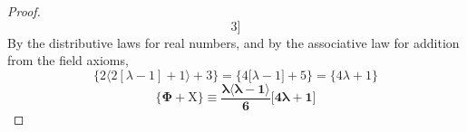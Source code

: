 \documentclass[preview]{standalone}
\begin{document}
\begin{proof}
\begin{equation*}
            3
        \Bigg]
    \end{equation*}
    By the distributive laws for real numbers, 
    and by the associative law for addition from the field axioms,
    \begin{equation*}
        \bigg \{
            2 \Big \langle 2 [ \lambda - 1 ] + 1 \Big \rangle + 3
        \bigg \}
            =
        \bigg \{
            4 [ \lambda - 1 \big ] + 5
        \bigg \}
            =
        \bigg \{
            4 \lambda + 1
        \bigg \}
    \end{equation*}
    \bm{$\therefore$}
    \begin{equation*}
        \bm{
            \Bigg \{
                \Phi
                    +
                \mathrm{X}
            \Bigg \}
                \equiv
            \frac{
                \lambda
                \big \langle \lambda - 1 \big \rangle
            }
            {6}
            \Bigg[
                4 \lambda + 1
            \Bigg]
        }
    \end{equation*}
\end{proof}
\end{document}
